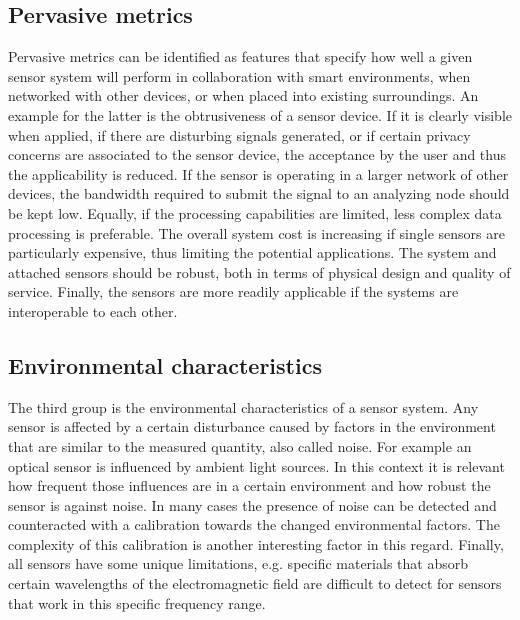\subsection{Pervasive metrics}
Pervasive metrics can be identified as features that specify how well a given sensor system will perform in collaboration with smart environments, when networked with other devices, or when placed into existing surroundings. An example for the latter is the obtrusiveness of a sensor device. If it is clearly visible when applied, if there are disturbing signals generated, or if certain privacy concerns are associated to the sensor device, the acceptance by the user and thus the applicability is reduced. If the sensor is operating in a larger network of other devices, the bandwidth required to submit the signal to an analyzing node should be kept low. Equally, if the processing capabilities are limited, less complex data processing is preferable. The overall system cost is increasing if single sensors are particularly expensive, thus limiting the potential applications. The system and attached sensors should be robust, both in terms of physical design and quality of service. Finally, the sensors are more readily applicable if the systems are interoperable to each other.

\subsection{Environmental characteristics}
The third group is the environmental characteristics of a sensor system. Any sensor is affected by a certain disturbance caused by factors in the environment that are similar to the measured quantity, also called noise. For example an optical sensor is influenced by ambient light sources. In this context it is relevant how frequent those influences are in a certain environment and how robust the sensor is against noise. In many cases the presence of noise can be detected and counteracted with a calibration towards the changed environmental factors. The complexity of this calibration is another interesting factor in this regard. Finally, all sensors have some unique limitations, e.g. specific materials that absorb certain wavelengths of the electromagnetic field are difficult to detect for sensors that work in this specific frequency range.

